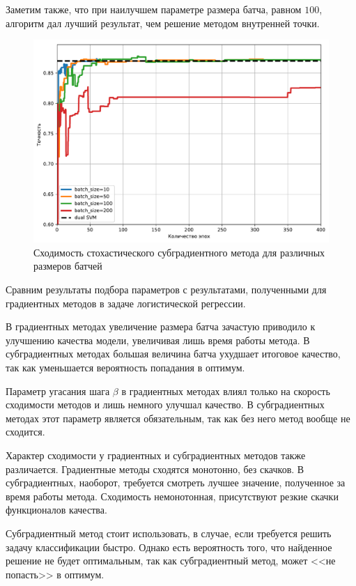 \documentclass[12pt,fleqn,unicode]{article}
\begin{document}
Заметим также, что при наилучшем параметре размера батча, равном $100$, алгоритм дал лучший результат, чем
решение методом внутренней точки.

\pagebreak

\begin{figure}[h!]
	\centering
	\caption{Сходимость стохастического субградиентного метода для различных размеров батчей}
	\label{fig4}
	\includegraphics[width=14cm]{../pict/bs.pdf}
\end{figure}

Сравним результаты подбора параметров с результатами, полученными для градиентных методов в задаче
логистической регрессии.

В градиентных методах увеличение размера батча зачастую приводило к улучшению качества модели, увеличивая
лишь время работы метода. В субградиентных методах большая величина батча ухудшает итоговое качество, так 
как уменьшается вероятность попадания в оптимум.

Параметр угасания шага $\beta$ в градиентных методах влиял только на скорость сходимости методов и лишь
немного улучшал качество. В субградиентных методах этот параметр является обязательным, так как без него 
метод вообще не сходится.

Характер сходимости у градиентных и субградиентных методов также различается. Градиентные методы сходятся 
монотонно, без скачков. В субградиентных, наоборот, требуется смотреть лучшее значение, полученное за время
работы метода. Сходимость немонотонная, присутствуют резкие скачки функционалов качества.

Субградиентный метод стоит использовать, в случае, если требуется решить задачу классификации быстро. Однако
есть вероятность того, что найденное решение не будет оптимальным, так как субградиентный метод, может 
<<не попасть>> в оптимум.
\end{document}
